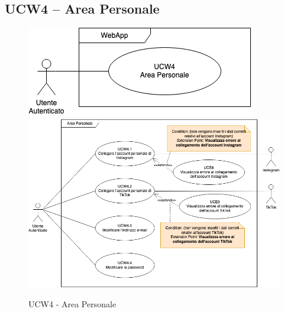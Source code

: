 \subsection{UCW4 – Area Personale}
\begin{figure}[!h]
\centering
\includegraphics[scale=0.5]{UC_images/UCW4.png}
\includegraphics[scale=0.5]{UC_images/UCW4-1.png}
\caption{UCW4 - Area Personale}
\end{figure}
